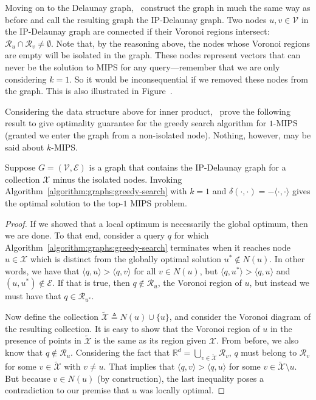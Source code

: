 Moving on to the Delaunay graph,~\cite{morozov2018ip-nsw} construct the graph in much the same
way as before and call the resulting graph the IP-Delaunay graph.
Two nodes $u, v \in \mathcal{V}$ in the IP-Delaunay graph are connected if their Voronoi
regions intersect: $\mathcal{R}_u \cap \mathcal{R}_v \neq \emptyset$. Note that, by the reasoning
above, the nodes whose Voronoi regions are empty will be isolated in the graph.
These nodes represent vectors that can never be the solution to MIPS for any
query---remember that we are only considering $k=1$. So it would be inconsequential
if we removed these nodes from the graph.
This is also illustrated in Figure~.

Considering the data structure above for inner product,~\cite{morozov2018ip-nsw} prove the following
result to give optimality guarantee for the greedy search algorithm for $1$-MIPS
(granted we enter the graph from a non-isolated node). Nothing, however, may be said about $k$-MIPS.

\begin{theorem}
    Suppose $G=(\mathcal{V}, \mathcal{E})$ is a graph that contains the
    IP-Delaunay graph for a collection $\mathcal{X}$ minus the isolated nodes.
    Invoking Algorithm~\ref{algorithm:graphs:greedy-search} with $k=1$
    and $\delta(\cdot, \cdot) = -\langle \cdot, \cdot \rangle$
    gives the optimal solution to the top-$1$ MIPS problem.
\end{theorem}
\begin{proof}
    If we showed that a local optimum is necessarily the global optimum, then we are done.
    To that end, consider a query $q$ for which Algorithm~\ref{algorithm:graphs:greedy-search} terminates
    when it reaches node $u \in \mathcal{X}$ which is distinct from the globally optimal
    solution $u^\ast \notin N(u)$. In other words, we have that
    $\langle q, u \rangle > \langle q, v \rangle$ for all $v \in N(u)$, but
    $\langle q, u^\ast \rangle > \langle q, u \rangle$ and
    $(u, u^\ast) \notin \mathcal{E}$.
    If that is true, then $q \notin \mathcal{R}_u$, the Voronoi region of $u$,
    but instead we must have that $q \in \mathcal{R}_{u^\ast}$.

    Now define the collection $\tilde{\mathcal{X}} \triangleq N(u) \cup \{ u \}$,
    and consider the Voronoi diagram of the resulting collection. It is easy to show
    that the Voronoi region of $u$ in the presence of points in $\tilde{\mathcal{X}}$
    is the same as its region given $\mathcal{X}$. From before, we also know that $q \notin \mathcal{R}_u$.
    Considering the fact that $\mathbb{R}^d = \bigcup_{v \in \tilde{\mathcal{X}}} \mathcal{R}_v$,
    $q$ must belong to $\mathcal{R}_v$ for some $v \in \tilde{\mathcal{X}}$ with $v \neq u$.
    That implies that $\langle q, v \rangle > \langle q, u \rangle$ for some $v \in \tilde{\mathcal{X}} \setminus u$.
    But because $v \in N(u)$ (by construction), the last inequality poses a contradiction to our
    premise that $u$ was locally optimal.
\end{proof}

